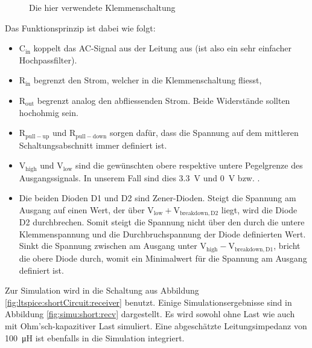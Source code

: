 \begin{figure}[h!tb]
    \centering
    
    \caption{Die hier verwendete Klemmenschaltung}
    \label{fig:circuit:clamper}
\end{figure}

Das Funktionsprinzip ist dabei wie folgt:

\begin{itemize}
    \firmlist
    \item
        $\mathrm{C_{in}}$ koppelt das AC-Signal aus  der Leitung aus (ist also
        ein sehr einfacher Hochpassfilter).
    \item
        $\mathrm{R_{in}}$ begrenzt den Strom,  welcher in die Klemmenschaltung
        fliesst,  \item $\mathrm{R_{out}}$  begrenzt analog  den abfliessenden
        Strom. Beide Widerst\"ande sollten hochohmig sein.
    \item
        $\mathrm{R_{pull-up}}$  und  $\mathrm{R_{pull-down}}$ sorgen  daf\"ur,
        dass  die   Spannung  auf  dem  mittleren   Schaltungsabschnitt  immer
        definiert ist.
    \item
        $\mathrm{V_{high}}$  und  $\mathrm{V_{low}}$  sind  die  gew\"unschten
        obere  respektive untere  Pegelgrenze des  Ausgangssignals. In unserem
        Fall sind dies \SI{3.3}{\volt} und \SI{0}{\volt} bzw. .
    \item
        Die   beiden  Dioden   D1   und  D2   sind  Zener-Dioden. Steigt   die
        Spannung  am Ausgang  auf einen  Wert, der  \"uber $\mathrm{V_{low}  +
        V_{breakdown,D2}}$ liegt, wird die Diode D2 durchbrechen. Somit steigt
        die Spannung nicht \"uber den durch die untere Klemmenspannung und die
        Durchbruchspannung  der  Diode  definierten Wert. Sinkt  die  Spannung
        zwischen  am  Ausgang  unter $\mathrm{V_{high}  -  V_{breakdown,D1}}$,
        bricht die obere Diode durch, womit ein Minimalwert f\"ur die Spannung
        am Ausgang definiert ist.
\end{itemize}

Zur   Simulation  wird   in     die   Schaltung  aus   Abbildung
\ref{fig:ltspice:shortCircuit:receiver}  benutzt. Einige Simulationsergebnisse
sind in  Abbildung \ref{fig:simu:short:recv} dargestellt. Es wird  sowohl ohne
Last  wie auch  mit  Ohm'sch-kapazitiver  Last simuliert. Eine  abgesch\"atzte
Leitungsimpedanz von  \SI{100}{\micro\henry} ist  ebenfalls in  die Simulation
integriert.

